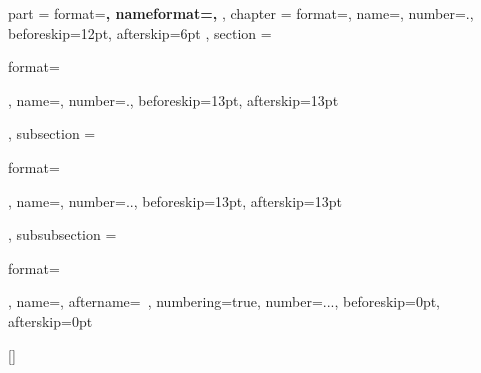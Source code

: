 

\ctexset
{
    part =
    {
        format=\centering{}\bfseries,
        nameformat=\centering\heiti\fontsize{48}{48}\bfseries,
    },
    chapter =
    {
        format=\centering{},
        name={},
        number=.,
        beforeskip=12pt,
        afterskip=6pt
    },
    section =
    {
        format=\raggedright\heiti {},
        name={},
        number=.,
        beforeskip=13pt,
        afterskip=13pt
    },
    subsection =
    {
        format=\raggedright{},
        name={},
        number=..,
        beforeskip=13pt,
        afterskip=13pt
    },
    subsubsection =
    {
        format=\raggedright{},
        name={},
        aftername=~,
        numbering=true,
        number=...,
        beforeskip=0pt,
        afterskip=0pt
    }
}

\makeatletter
{}
\makeatother

\renewcommand{\contentsname}{ \zihao{2}\heiti 目\ \ 录\vspace{1em}}

[\bibname]{
}
